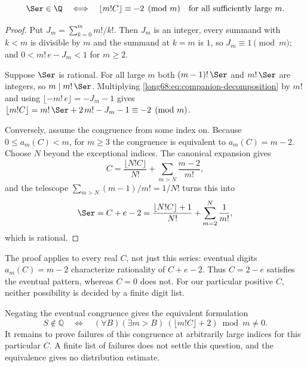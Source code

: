 \label{long68:res:lead-companion-orbit}
\begin{proposition}\label{long68:res:companion-orbit}
\[
 \Ser\in\Q
 \quad\Longleftrightarrow\quad
 \lfloor m!C\rfloor\equiv-2\pmod m
 \quad\hbox{for all sufficiently large }m.
\]
\end{proposition}

\begin{proof}
Put $J_m=\sum_{k=0}^{m}m!/k!$.  Then $J_m$ is an integer, every summand with
$k<m$ is divisible by $m$ and the summand at $k=m$ is $1$, so
$J_m\equiv1\pmod m$; and $0<m!\,e-J_m<1$ for $m\ge2$.

Suppose $\Ser$ is rational.  For all large $m$ both $(m-1)!\,\Ser$ and
$m!\,\Ser$ are integers, so $m\mid m!\,\Ser$.  Multiplying
\eqref{long68:eq:companion-decomposition} by $m!$ and using
$\lfloor -m!\,e\rfloor=-J_m-1$ gives
$\lfloor m!C\rfloor=m!\,\Ser+2\,m!-J_m-1\equiv-2\pmod m$.

Conversely, assume the congruence from some index on.  Because
$0\le a_m(C)<m$, for $m\ge3$ the congruence is equivalent to $a_m(C)=m-2$.
Choose $N$ beyond the exceptional indices.  The canonical expansion gives
\[
 C=\frac{\lfloor N!C\rfloor}{N!}+\sum_{m>N}\frac{m-2}{m!},
\]
and the telescope $\sum_{m>N}(m-1)/m!=1/N!$ turns this into
\[
 \Ser=C+e-2
 =\frac{\lfloor N!C\rfloor+1}{N!}+\sum_{m=2}^{N}\frac1{m!},
\]
which is rational.
\end{proof}

The proof applies to every real $C$, not just this series: eventual
digits $a_m(C)=m-2$ characterize rationality of $C+e-2$. Thus $C=2-e$
satisfies the eventual pattern, whereas $C=0$ does not. For our
particular positive $C$, neither possibility is decided by a finite
digit list.

Negating the eventual congruence gives the equivalent formulation
\begin{equation}
 S\notin\mathbb Q\quad\Longleftrightarrow\quad
 (\forall B)(\exists m>B)\ (\lfloor m!C\rfloor+2)\bmod m\ne0.
 \label{long68:eq:companion-cofinal}
\end{equation}
It remains to prove failures of this congruence at arbitrarily large
indices for this particular $C$. A finite list of failures does not
settle this question, and the equivalence gives no distribution estimate.

